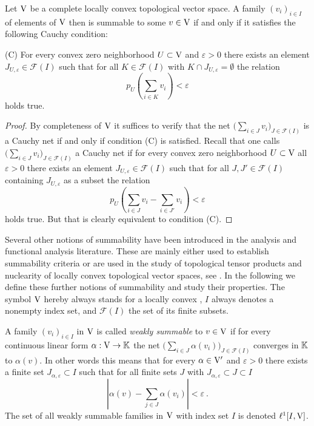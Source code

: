 \begin{proposition}
  Let $\mathrm{V}$ be a complete locally convex topological vector space. 
  A family $(v_i)_{i \in I}$ of elements of $\mathrm{V}$ then is summable 
  to some $v\in \mathrm{V}$ if and only if it satisfies the following Cauchy condition:
  \begin{axiomlist}[\hspace{1pt}]
  \item[\textup{\sffamily (C)}] 
    For every convex zero neighborhood $U \subset \mathrm{V}$ and $\varepsilon >0$ there exists an element
    $J_{U,\varepsilon} \in \mathscr{F} (I)$ such that for all $K \in \mathscr{F} (I)$ with  $ K \cap J_{U,\varepsilon} = \emptyset$
    the relation 
    \[
      p_U \left( \sum_{i \in K} v_i \right) < \varepsilon 
    \]
    holds true. 
  \end{axiomlist}
 
\end{proposition}
\begin{proof}
  By completeness of $\mathrm{V}$ it suffices to verify that the net $\Big( \sum_{i \in J} v_i \Big)_{J \in \mathscr{F}(I)}$ is a Cauchy net
  if and only if condition \textup{\sffamily (C)} is satisfied. Recall that one calls
  $\Big( \sum_{i \in J} v_i \Big)_{J \in \mathscr{F}(I)}$ a Cauchy net if for every convex zero neighborhood $U \subset \mathrm{V}$ 
  all $\varepsilon >0$ there exists an element $J_{U,\varepsilon} \in \mathscr{F} (I)$ such that for all $J,J' \in \mathscr{F} (I)$ 
  containing  $ J_{U,\varepsilon}$ as a subset the relation 
  \[
     p_U \left( \sum_{i \in J} v_i - \sum_{i\in J'} v_i \right) < \varepsilon 
  \]
  holds true. 
  But that is clearly equivalent to condition \textup{\sffamily (C)}. 
\end{proof}

\para Several other notions of summability have been introduced in the analysis and functional analysis literature.  
These are mainly either used to establish summability criteria or are used in the study of 
topological tensor products and nuclearity of locally convex topological vector spaces, see \cite{GroPTTEN,PieNLCS}. 
In the following we define these further notions of summability and study their properties.
The symbol $\mathrm{V}$  hereby always stands for a locally convex \tvs, $I$ always denotes a nonempty
index set, and $\mathscr{F} (I)$ the set of its finite subsets.

\begin{definition}
  A family   $(v_i)_{i \in I}$ in $\mathrm{V}$ is called \emph{weakly summable} to $v \in \mathrm{V}$ if for 
  every continuous linear form $\alpha : \mathrm{V} \to \mathbb{K}$ the net 
  $\Big( \sum_{i \in J} \alpha( v_i ) \Big)_{J \in \mathscr{F}(I)}$ converges in $\mathbb{K}$ to $\alpha ( v )$.
  In other words this means that for every $\alpha \in \mathrm{V}'$ and $\varepsilon >0$ there exists a finite set 
  $J_{\alpha,\varepsilon} \subset I$ such that for all finite sets $J$ with $J_{\alpha,\varepsilon} \subset  J \subset I $ 
  \[
    \left| \alpha (v) -  \sum_{j\in J} \alpha( v_i )   \right|< \varepsilon \ . 
  \]
  The set of all weakly summable families in $\mathrm{V}$ with index set $I$ is denoted $\ell^1 [I, \mathrm{V}]$.
\end{definition}

